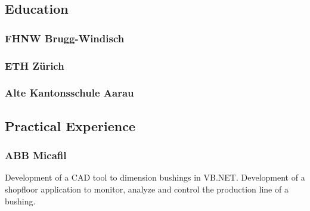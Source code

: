     \begin{timeline}
    
    
    \subsection{Education}
    
    \subsubsection{FHNW Brugg-Windisch}
    \sectionsep
    
    \subsubsection{ETH Zürich}
    \sectionsep
    
    \subsubsection{Alte Kantonsschule Aarau}
    \sectionsep
    
    
    \subsection{Practical Experience}
    
    \subsubsection{ABB Micafil}
    Development of a CAD tool to dimension bushings in VB.NET.
    Development of a shopfloor application to monitor, analyze and control the production line of a bushing.
    \sectionsep
    

\end{timeline}
